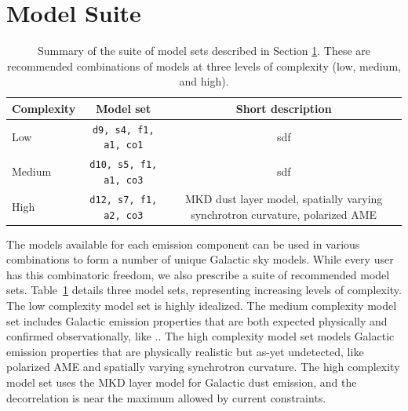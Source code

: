 \documentclass[twocolumn]{aastex631}
\begin{document}


\section{Model Suite}\label{sec:modelsuite}

\begin{table}
    \centering
    \begin{tabular}{lcc}
    
    \toprule 
    Complexity & Model set & Short description \\
    \midrule
    Low  & \texttt{d9, s4, f1, a1, co1} & sdf  \\
    Medium  & \texttt{d10, s5, f1, a1, co3} & sdf   \\
    High  & \texttt{d12, s7, f1, a2, co3} & MKD dust layer model, spatially varying synchrotron curvature, polarized AME  \\
   
   \bottomrule
    \end{tabular}
    \caption{Summary of the suite of model sets described in Section \ref{sec:modelsuite}. These are recommended combinations of models at three levels of complexity (low, medium, and high).  }
    \label{tab:modelsuite}
\end{table}

The models available for each emission component can be used in various combinations to form a number of unique Galactic sky models. While every user has this combinatoric freedom, we also prescribe a suite of recommended model sets. Table~\ref{tab:modelsuite} details three model sets, representing increasing levels of complexity. The low complexity model set is highly idealized.
The medium complexity model set includes Galactic emission properties that are both expected physically and confirmed observationally, like ..
The high complexity model set models Galactic emission properties that are physically realistic but as-yet undetected, like polarized AME and spatially varying synchrotron curvature. The high complexity model set uses the MKD layer model for Galactic dust emission, and the decorrelation is near the maximum allowed by current constraints.
\end{document}
